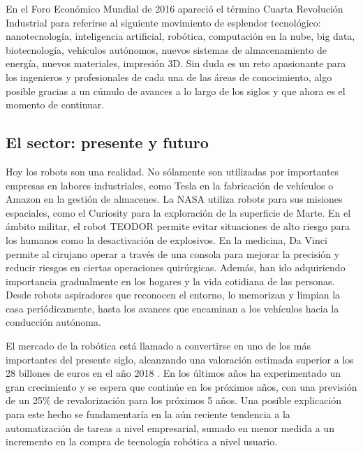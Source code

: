 \documentclass[12pt,spanish,chapterprefix, numbers=noenddot]{book}
\numberwithin{equation}{section}
\numberwithin{figure}{section}
\begin{document}
En el Foro Económico Mundial de 2016 
\cite{forum_2016} apareció el término Cuarta Revolución Industrial para referirse al siguiente movimiento de esplendor tecnológico: nanotecnología, inteligencia artificial, robótica, computación en la nube, big data, biotecnología, vehículos autónomos, nuevos sistemas de almacenamiento de energía, nuevos materiales, impresión 3D. Sin duda es un reto apasionante para los ingenieros y profesionales de cada una de las áreas de conocimiento, algo posible gracias a un cúmulo de avances a lo largo de los siglos y que ahora es el momento de continuar. 


\subsection{El sector: presente y futuro}
Hoy los robots son una realidad. No sólamente son utilizadas por importantes empresas en labores industriales, como Tesla en la fabricación de vehículos o Amazon en la gestión de almacenes. La NASA utiliza robots para sus misiones espaciales, como el Curiosity para la exploración de la superficie de Marte.  En el ámbito militar, el robot TEODOR permite evitar situaciones de alto riesgo para los humanos como la desactivación de explosivos. En la medicina, Da Vinci permite al cirujano operar a través de una consola para mejorar la precisión y reducir riesgos en ciertas operaciones quirúrgicas. Además, han ido adquiriendo importancia gradualmente en los hogares y la vida cotidiana de las personas. Desde robots aspiradores que reconocen el entorno, lo memorizan y limpian la casa periódicamente, hasta los avances que encaminan a los vehículos hacia la conducción autónoma. 

El mercado de la robótica está llamado a convertirse en uno de los más importantes del presente siglo, alcanzando una valoración estimada superior a los 28 billones de euros en el año 2018 \cite{robotics_market}. En los últimos años ha experimentado un gran crecimiento y se espera que continúe en los próximos años, con una previsión de un 25\% de revalorización para los próximos 5 años. 
Una posible explicación para este hecho se fundamentaría en la aún reciente tendencia a la automatización de tareas a nivel empresarial, sumado en menor medida a un incremento en la compra de tecnología robótica a nivel usuario.
\end{document}
